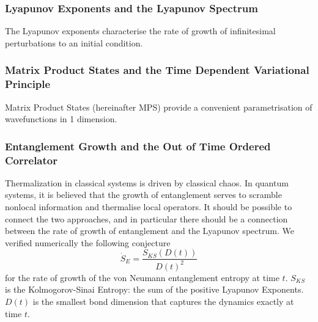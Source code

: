 \documentclass{article}
\begin{document}
\subsubsection{Lyapunov Exponents and the Lyapunov Spectrum}
%
The Lyapunov exponents characterise the rate of growth of infinitesimal perturbations to an initial condition.
%
\subsubsection{Matrix Product States and the Time Dependent Variational Principle}
%
Matrix Product States (hereinafter MPS) provide a convenient parametrisation of wavefunctions in 1 dimension.
%
\subsubsection{Entanglement Growth and the Out of Time Ordered Correlator}
%
Thermalization in classical systems is driven by classical chaos. 
In quantum systems, it is believed that the growth of entanglement serves to scramble nonlocal information and thermalise local operators. 
It should be possible to connect the two approaches, and in particular there should be a connection between the rate of growth of entanglement and the Lyapunov spectrum. 
We verified numerically the following conjecture
\begin{equation}
    \dot{S}_E = \frac{S_{KS}(D(t))}{D(t)^2}
\end{equation}
for the rate of growth of the von Neumann entanglement entropy at time $t$.
$S_{KS}$ is the Kolmogorov-Sinai Entropy: the sum of the positive Lyapunov Exponents. 
$D(t)$ is the smallest bond dimension that captures the dynamics exactly at time $t$.
%
\end{document}
